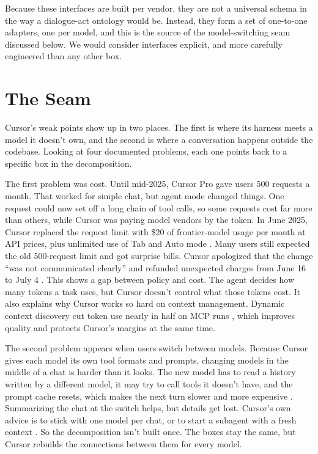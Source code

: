 \documentclass[11pt]{article}
\begin{document}
Because these interfaces are built per vendor, they are not a universal schema in the way a dialogue-act ontology would be. Instead, they form a set of one-to-one adapters, one per model, and this is the source of the model-switching seam discussed below. We would consider interfaces explicit, and more carefully engineered than any other box.


\section{The Seam}

Cursor's weak points show up in two places. The first is where its harness meets a model it doesn't own, and the second is where a conversation happens outside the codebase. Looking at four documented problems, each one points back to a specific box in the decomposition.

The first problem was cost. Until mid-2025, Cursor Pro gave users 500 requests a month. That worked for simple chat, but agent mode changed things. One request could now set off a long chain of tool calls, so some requests cost far more than others, while Cursor was paying model vendors by the token. In June 2025, Cursor replaced the request limit with \$20 of frontier-model usage per month at API prices, plus unlimited use of Tab and Auto mode \citep{cursor2025pricing}. Many users still expected the old 500-request limit and got surprise bills. Cursor apologized that the change ``was not communicated clearly'' and refunded unexpected charges from June 16 to July 4 \citep{cursor2025pricing}. This shows a gap between policy and cost. The agent decides how many tokens a task uses, but Cursor doesn't control what those tokens cost. It also explains why Cursor works so hard on context management. Dynamic context discovery cut token use nearly in half on MCP runs \citep{katz2026dynamic}, which improves quality and protects Cursor's margins at the same time.

The second problem appears when users switch between models. Because Cursor gives each model its own tool formats and prompts, changing models in the middle of a chat is harder than it looks. The new model has to read a history written by a different model, it may try to call tools it doesn't have, and the prompt cache resets, which makes the next turn slower and more expensive \citep{heule2026harness}. Summarizing the chat at the switch helps, but details get lost. Cursor's own advice is to stick with one model per chat, or to start a subagent with a fresh context \citep{heule2026harness}. So the decomposition isn't built once. The boxes stay the same, but Cursor rebuilds the connections between them for every model.
\end{document}
